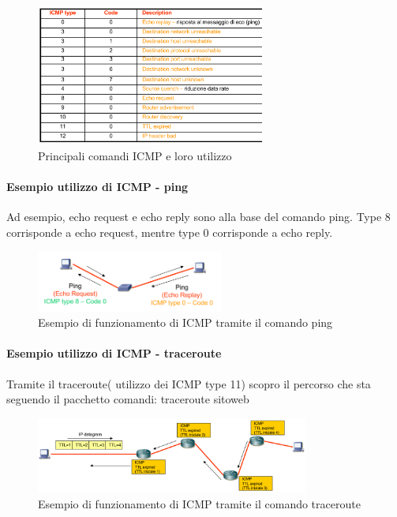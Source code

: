 \begin{figure}[h!]
    \centering
    \includegraphics[width=0.67\textwidth]{images/comandiicmp.png}
    \caption{Principali comandi ICMP e loro utilizzo}
    \label{fig:comandiicmp}
\end{figure}



\paragraph{Esempio utilizzo di ICMP - ping}
Ad esempio, echo request e echo reply sono alla base del comando ping.
Type 8 corrisponde a echo request, mentre type 0 corrisponde a echo reply. 

\begin{figure}[h!]
    \centering
    \includegraphics[width=0.55\textwidth]{images/pingicmp.png}
    \caption{Esempio di funzionamento di ICMP tramite il comando ping}
    \label{fig:pingicmp}
\end{figure}
\paragraph{Esempio utilizzo di ICMP - traceroute}
Tramite il traceroute( utilizzo dei ICMP type 11) scopro il percorso che sta seguendo il pacchetto 
comandi: traceroute sitoweb

\begin{figure}[h!]
    \centering
    \includegraphics[width=0.8\textwidth]{images/traceroute.png}
    \caption{Esempio di funzionamento di ICMP tramite il comando traceroute}
    \label{fig:traceroute}
\end{figure}
\newpage




